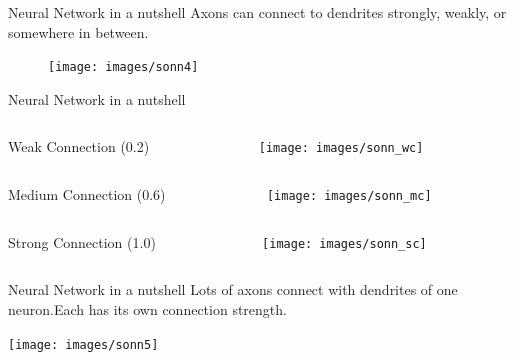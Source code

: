 \documentclass[10pt]{beamer}
\begin{document}
	\begin{frame}[c]{Neural Network in a nutshell}
		\large{Axons can connect to dendrites strongly, weakly, or somewhere in between.}
		\begin{figure}
			\texttt{[image: images/sonn4]}
		\end{figure}
	\end{frame}
	\begin{frame}[c]{Neural Network in a nutshell}
		\begin{columns}
			\begin{column}{0.5\textwidth}
				\begin{center}
					\large{Weak Connection (0.2)}
				\end{center}
			\end{column}
			\begin{column}{0.5\textwidth}
				\begin{center}
					\texttt{[image: images/sonn\_wc]}
				\end{center}
			\end{column}		
		\end{columns}
		\begin{columns}
			\begin{column}{0.5\textwidth}
				\begin{center}
					\large{Medium Connection (0.6)}
				\end{center}
			\end{column}
			\begin{column}{0.5\textwidth}
				\begin{center}
					\texttt{[image: images/sonn\_mc]}
				\end{center}
			\end{column}		
		\end{columns}
		\begin{columns}
			\begin{column}{0.5\textwidth}
				\begin{center}
					\large{Strong Connection (1.0)}
				\end{center}
			\end{column}
			\begin{column}{0.5\textwidth}
				\begin{center}
					\texttt{[image: images/sonn\_sc]}
				\end{center}
			\end{column}		
		\end{columns}
	\end{frame}
	\begin{frame}[c]{Neural Network in a nutshell}
		\large{Lots of axons connect with dendrites of one neuron.Each has its own connection strength.}
			\begin{center}
				\texttt{[image: images/sonn5]}
			\end{center}
	\end{frame}
\end{document}
